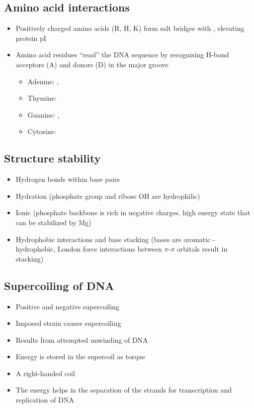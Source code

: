 \documentclass[letterpaper, 12pt]{article}
\begin{document}
\subsection*{Amino acid interactions}
\begin{itemize}
\item Positively charged amino acids (R, H, K) form salt bridges with , elevating protein pI
\item Amino acid residues ``read'' the DNA sequence by recognising H-bond acceptors (A) and donors (D) in the major groove
\begin{itemize}
\item Adenine: , 
\item Thymine: 
\item Guanine: , 
\item Cytosine: 
\end{itemize}
\end{itemize}

\subsection*{Structure stability}

\begin{itemize}
\item Hydrogen bonds within base pairs
\item Hydration (phosphate group and ribose OH are hydrophilic)
\item Ionic (phosphate backbone is rich in negative charges, high energy state that can be stabilized by Mg)
\item Hydrophobic interactions and base stacking (bases are aromatic - hydrophobic, London force interactions between $\pi$-$\pi$ orbitals result in stacking)
\end{itemize}

\subsection*{Supercoiling of DNA}

\begin{itemize}
\item Positive and negative supercoiling
\item Imposed strain causes supercoiling
\item Results from attempted unwinding of DNA
\item Energy is stored in the supercoil as torque
\item A right-handed coil
\item The energy helps in the separation of the strands for transcription and replication of DNA
\end{itemize}
\end{document}
